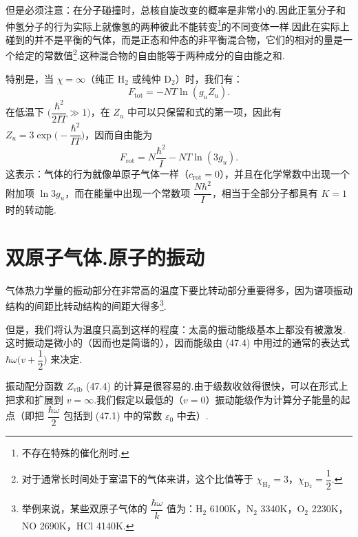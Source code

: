 但是必须注意：在分子碰撞时，总核自旋改变的概率是非常小的.因此正氢分子和仲氢分子的行为实际上就像氢的两种彼此不能转变\footnote{不存在特殊的催化剂时.}的不同变体一样.因此在实际上碰到的并不是平衡的气体，而是正态和仲态的非平衡混合物，它们的相对的量是一个给定的常数值\footnote{对于通常长时间处于室温下的气体来讲，这个比值等于 $\chi_{\mathrm{H}_2}=3$，$\chi_{\mathrm{D}_2}=\dfrac{1}{2}$.}.这种混合物的自由能等于两种成分的自由能之和.

特别是，当 $\chi=\infty$（纯正 $\mathrm{H}_2$ 或纯仲 $\mathrm{D}_2$）时，我们有：
\begin{equation*}
  F_{\mathrm{tot}}=-NT\ln\left(g_uZ_u\right).
\end{equation*}
在低温下 $\Big(\dfrac{\hbar^2}{2IT}\gg1\Big)$，在 $Z_u$ 中可以只保留和式的第一项，因此有 $Z_u=3\exp\Big(-\dfrac{\hbar^2}{IT}\Big)$，因而自由能为
\begin{equation*}
  F_{\mathrm{rot}}=N\frac{\hbar^2}{I}-NT\ln\left(3g_u\right).
\end{equation*}
这表示：气体的行为就像单原子气体一样（$c_{\mathrm{rot}}=0$），并且在化学常数中出现一个附加项 $\ln3g_u$，而在能量中出现一个常数项 $\dfrac{N\hbar^2}{I}$，相当于全部分子都具有 $K=1$ 时的转动能.

\section{双原子气体.原子的振动}

气体热力学量的振动部分在非常高的温度下要比转动部分重要得多，因为谱项振动结构的间距比转动结构的间距大得多\footnote{举例来说，某些双原子气体的 $\dfrac{\hbar\omega}{k}$ 值为：$\mathrm{H}_2$ 6100K，$\mathrm{N}_2$ 3340K，$\mathrm{O}_2$ 2230K，NO 2690K，HCl 4140K.}.

但是，我们将认为温度只高到这样的程度：太高的振动能级基本上都没有被激发.这时振动是微小的（因而也是简谐的），因而能级由 (47.4) 中用过的通常的表达式 $\hbar\omega\big(v+\dfrac{1}{2}\big)$ 来决定.

振动配分函数 $Z_{\mathrm{vib}}$ (47.4) 的计算是很容易的.由于级数收敛得很快，可以在形式上把求和扩展到 $v=\infty$.我们假定以最低的（$v=0$）振动能级作为计算分子能量的起点（即把 $\dfrac{\hbar\omega}{2}$ 包括到 (47.1) 中的常数 $\varepsilon_0$ 中去）.

